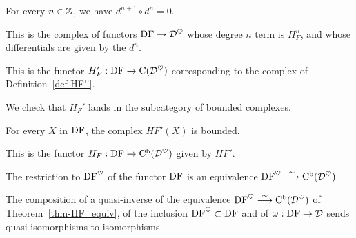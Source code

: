 \begin{proposition}
\label{prop-HF-condition}
\leanok
{}
For every $n\in\mathbb{Z}$, we have $d^{n+1}\circ d^n = 0$.

\end{proposition}

\begin{definition}
\label{def-HF''}
\leanok
{}
This is the complex of functors $\operatorname{DF}\to \mathcal{D}^\heartsuit$ whose degree $n$ term is $H_F^n$, and 
whose differentials are given by the $d^n$.

\end{definition}

\begin{definition}
\label{def-HF'}
\leanok
{}
This is the functor $H_F':\operatorname{DF}\to \mathrm{C}(\mathcal{D}^\heartsuit)$ corresponding to the complex of
Definition~\ref{def-HF''}.

\end{definition}

We check that $H_F'$ lands in the subcategory of bounded complexes.

\begin{proposition}
\label{prop-HF_bounded}
\leanok
{}
For every $X$ in $\operatorname{DF}$, the complex $HF'(X)$ is bounded.

\end{proposition}

\begin{definition}
\label{def-HF}
\leanok
{}
This is the functor $H_F:\operatorname{DF}\to \operatorname{\mathrm{C}^b}(\mathcal{D}^\heartsuit)$ given by $HF'$.

\end{definition}

\begin{theorem}
\label{thm-HF_equiv}
\leanok
{}
The restriction to $\operatorname{DF}^\heartsuit$ of the functor $\operatorname{DF}$ is an equivalence $\operatorname{DF}^\heartsuit\stackrel{\sim}{\longrightarrow}\operatorname{\mathrm{C}^b}(\mathcal{D}^\heartsuit)$

\end{theorem}

\begin{proposition}
\label{prop-real_aux}
\leanok
{}
The composition of a quasi-inverse of the equivalence $\operatorname{DF}^\heartsuit\stackrel{\sim}{\longrightarrow}\operatorname{\mathrm{C}^b}(\mathcal{D}^\heartsuit)$ of 
Theorem~\ref{thm-HF_equiv}, of the inclusion $\operatorname{DF}^\heartsuit\subset\operatorname{DF}$ and of $\omega :\operatorname{DF}\to\mathcal{D}$ 
sends quasi-isomorphisms to isomorphisms.

\end{proposition}

